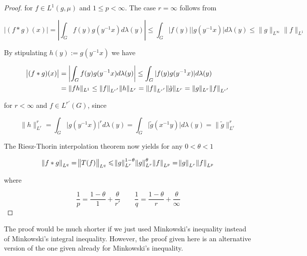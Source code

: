 \begin{remark}
\begin{proof}
	for $f \in L^1(g,\mu)$ and $1 \leqslant p < \infty$. The case $r = \infty$ follows from
	
	\begin{equation*}
		\vert (f \ast g)(x) \vert = \left\vert \int_G f(y)g(y^{-1}x) d\lambda(y)\right\vert \leq \int_G \vert f(y)\vert \vert g(y^{-1}x)\vert d\lambda(y) \leq \|g\|_{L^\infty}\|f\|_{L^1}
	\end{equation*}
	
	By stipulating $h(y) := g(y^{-1}x)$ we have 

	\begin{equation*}
		\begin{aligned}
			\abs{(f \ast g)(x)} &= \left\vert \int_G f(y)g(y^{-1}x) d\lambda(y)\right\vert \leq \int_G \vert f(y)g(y^{-1}x)\vert d\lambda(y)\\
			&= \|fh\|_{L^1} \leq \|f\|_{L^{r'}} \|h\|_{L^r} = \|f\|_{L^{r'}} \|\tilde{g}\|_{L^r} = \|g\|_{L^r} \|f\|_{L^{r'}}
		\end{aligned}
	\end{equation*}

	for $r < \infty$ and $f \in L^{r'}\left( G \right)$, since

	\begin{equation*}
		\|h\|^r_{L^r} = \int_G \vert g(y^{-1}x)\vert^r d\lambda(y) = \int_G \vert\tilde{g}(x^{-1}y)\vert d\lambda(y) = \|\tilde{g}\|^r_{L^{r}}
	\end{equation*}

	The Riesz-Thorin interpolation theorem now yields for any $0 < \theta < 1$

	\begin{equation}
		\norm{f \ast g}_{L^q} = \norm{T(f)}_{L^q} \leqslant \norm{g}_{L^r}^{1 - \theta}\norm{g}_{L^r}^{\theta} \norm{f}_{L^p} = \norm{g}_{L^r}\norm{f}_{L^p}
	\end{equation}

	\noindent where 

	\begin{equation*}
		\frac{1}{p} = \frac{1 - \theta}{1} + \frac{\theta}{r'} \qquad \frac{1}{q} = \frac{1 - \theta}{r} + \frac{\theta}{\infty}
	\end{equation*}
\end{proof}
\end{remark}

\begin{remark}
	The proof would be much shorter if we just used Minkowski's inequality \textup{\cite[21--22]{grafakos:fourier:2014}} instead of Minkowski's integral inequality. However, the proof given here is an alternative version of the one given already for Minkowski's inequality.
\end{remark}
